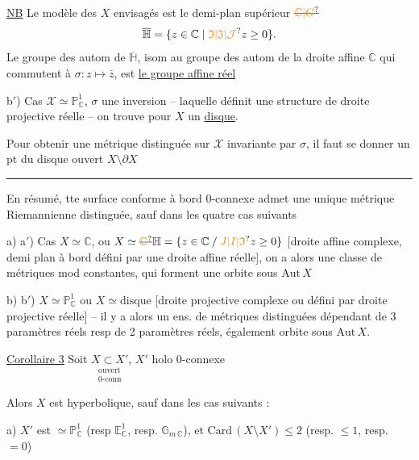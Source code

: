 \uline{NB}  Le modèle des $X$ envisagés est le demi-plan supérieur $\deleted{\unsure{\mathbb C|G}}$
\[
\overline{\mathbb H}=\{z\in\mathbb C\mid\unsure{\mathfrak I|\mathfrak J|\mathcal J}z\geq0\}.
\]
Le groupe des autom de $\overline{\mathbb H}$, isom au groupe des autom de la droite affine $\mathbb C$ qui commutent à $\sigma:z\longmapsto\bar z$, est \uline{le groupe affine réel}

b$'$) Cas $\mathscr X\simeq\mathbb P^1_{\mathbb C}$, $\sigma$ une inversion -- laquelle définit une structure de droite projective réelle -- on trouve  pour $X$ un \uline{disque}.

Pour obtenir une métrique distinguée sur $\mathscr X$ invariante par $\sigma$, il faut se donner un pt du disque ouvert $X\setminus\partial X$

\hfill\rule{0.34\linewidth}{0.4pt}\hfill\null

En résumé, tte surface conforme à bord $0$-connexe admet une unique métrique Riemannienne distinguée, sauf dans les quatre cas suivants

a) a$'$) Cas $X\simeq\mathbb C$, ou $X\simeq\deleted{\unsure{\mathbb C}}\mathbb H=\{z\in\mathbb C\mathbin{/}\unsure{J|I|\mathfrak I}z\geq 0\}$ [droite affine complexe, demi plan à bord défini par une droite affine réelle], on a alors une classe de métriques mod constantes, qui forment une orbite sous $\mathrm{Aut}\, X$

b) b$'$) $X\simeq\mathbb P^1_{\mathbb C}$ ou $X\simeq\text{disque}$ [droite projective complexe ou  défini par droite projective réelle] -- il y a alors un ens. de métriques distinguées dépendant de 3 paramètres réels resp de 2 paramètres réels, également orbite sous $\mathrm{Aut}\,X$.


\uline{Corollaire 3} Soit $\underset{\substack{\text{ouvert}\\\text{0-conn}}}{X\subset X'}$, $X'$ holo $0$-connexe

Alors $X$ est hyperbolique, sauf dans les cas suivants :

a) $X'$ est $\simeq\mathbb P^1_{\mathbb C}$ (resp $\mathbb E^1_{\mathbb C}$, resp. $\mathbb G_{m\,\mathbb C}$), et $\mathrm{Card}\,(X\setminus X')\leq 2$ (resp. $\leq 1$, resp. $=0$)

